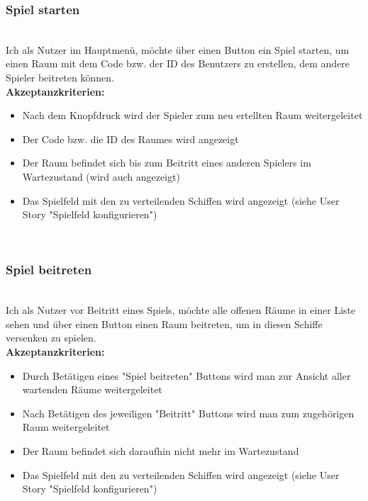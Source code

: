 \documentclass[conference]{IEEEtran}
\begin{document}
	\subsubsection{Spiel starten}
	\ \\
	Ich als Nutzer im Hauptmenü, möchte über einen Button ein Spiel starten, um einen Raum mit dem Code bzw. der ID des Benutzers zu erstellen, dem andere Spieler beitreten können. \\
	\textbf{Akzeptanzkriterien:}
	\begin{itemize}
		\item Nach dem Knopfdruck wird der Spieler zum neu ertellten Raum weitergeleitet
		\item Der Code bzw. die ID des Raumes wird angezeigt
        \item Der Raum befindet sich bis zum Beitritt eines anderen Spielers im Wartezustand (wird auch angezeigt)
        \item Das Spielfeld mit den zu verteilenden Schiffen wird angezeigt (siehe User Story "Spielfeld konfigurieren")
	\end{itemize}
	\ \\
	\subsubsection{Spiel beitreten}
	\ \\
	Ich als Nutzer vor Beitritt eines Spiels, möchte alle offenen Räume in einer Liste sehen und über einen Button einen Raum beitreten, um in diesen Schiffe versenken zu spielen. \\
	\textbf{Akzeptanzkriterien:}
	\begin{itemize}
		\item Durch Betätigen eines "Spiel beitreten" Buttons wird man zur Ansicht aller wartenden        Räume weitergeleitet
		\item Nach Betätigen des jeweiligen "Beitritt" Buttons wird man zum zugehörigen Raum              weitergeleitet
		\item Der Raum befindet sich daraufhin nicht mehr im Wartezustand
		\item Das Spielfeld mit den zu verteilenden Schiffen wird angezeigt (siehe User Story             "Spielfeld konfigurieren")
	\end{itemize}
	\ \\
\end{document}
